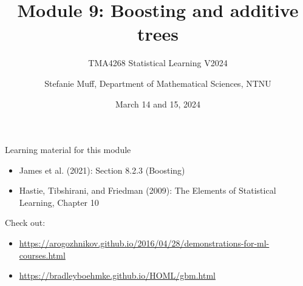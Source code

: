 \documentclass[
  10pt,
  ignorenonframetext,
]{beamer}
\title{Module 9: Boosting and additive trees}
\subtitle{TMA4268 Statistical Learning V2024}
\author{Stefanie Muff, Department of Mathematical Sciences, NTNU}
\date{March 14 and 15, 2024}
\providecommand{\tightlist}{%
  \setlength{\itemsep}{0pt}\setlength{\parskip}{0pt}}
\begin{document}
\frame{\titlepage}

\begin{frame}
\begin{block}{Learning material for this module}
\protect\hypertarget{learning-material-for-this-module}{}
\(~\)

\begin{itemize}
\tightlist
\item
  James et al. (2021): Section 8.2.3 (Boosting)
\end{itemize}

\vspace{2mm}

\begin{itemize}
\tightlist
\item
  Hastie, Tibshirani, and Friedman (2009): The Elements of Statistical
  Learning, Chapter 10
\end{itemize}

\vspace{8mm}

Check out:

\begin{itemize}
\item
  \url{https://arogozhnikov.github.io/2016/04/28/demonstrations-for-ml-courses.html}
\item
  \url{https://bradleyboehmke.github.io/HOML/gbm.html}
\end{itemize}
\end{block}
\end{frame}
\end{document}
